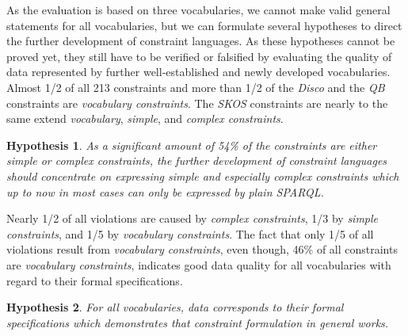 \documentclass{llncs}
\newcommand{\tb}[1]{\todo[size=\small, color=green!40]{\textbf{Thomas:} #1}}
\newtheorem{hyp}{Hypothesis}
\begin{document}
As the evaluation is based on three vocabularies, 
we cannot make valid general statements for all vocabularies,
but we can formulate several hypotheses to direct the further development of constraint languages.
As these hypotheses cannot be proved yet, 
they still have to be verified or falsified
by evaluating the quality of data represented by further well-established and newly developed vocabularies.
Almost 1/2 of all 213 constraints and more than 1/2 of the \emph{Disco} and the \emph{QB} constraints are \emph{vocabulary constraints}.
The \emph{SKOS} constraints are nearly to the same extend \emph{vocabulary}, \emph{simple}, and \emph{complex constraints}. 
\begin{hyp}
As a significant amount of 54\% of the constraints are either simple or complex constraints,
the further development of constraint languages should concentrate on expressing simple and especially complex constraints which up to now in most cases can only be expressed by plain SPARQL.  
\end{hyp} 

Nearly 1/2 of all violations are caused by \emph{complex constraints}, 1/3 by \emph{simple constraints}, and 1/5 by \emph{vocabulary constraints}.
The fact that only 1/5 of all violations result from \emph{vocabulary constraints}, 
even though, 46\% of all constraints are \emph{vocabulary constraints},
indicates good data quality for all vocabularies with regard to their formal specifications.
\begin{hyp}
For all vocabularies, data corresponds to their formal specifications which demonstrates that constraint formulation in general works. 
\end{hyp}
\end{document}
